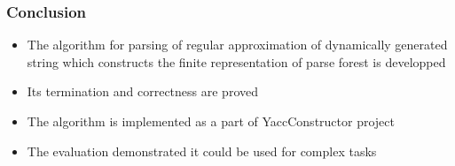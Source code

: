 \documentclass{beamer}
\begin{document}
\begin{frame}
  \transwipe[direction=90]
  \frametitle{Conclusion}
  \begin{itemize}
    \item The algorithm for parsing of regular approximation of dynamically 
generated string which constructs the finite representation of parse forest is 
developped
    \item Its termination and correctness are proved
    \item The algorithm is implemented as a part of YaccConstructor project
    \item The evaluation demonstrated it could be used for complex tasks
  \end{itemize}
\end{frame}
\end{document}
